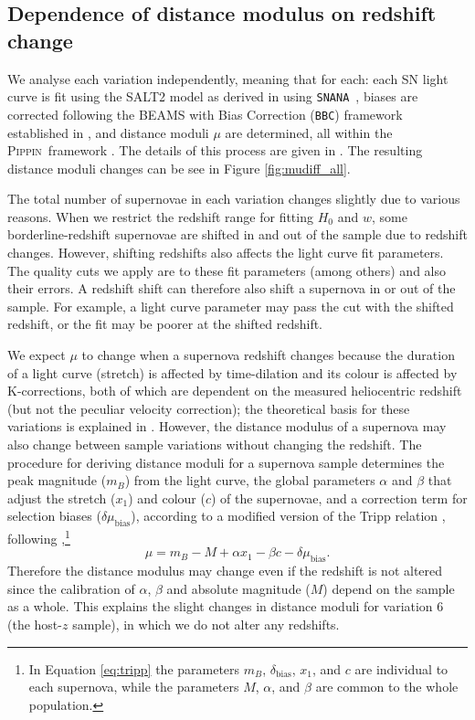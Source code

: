 \documentclass[
  journal=pasa,
  manuscript=research-paper,
  year=2022,
]{cup-journal}
\newcommand{\Pippin}{\textsc{Pippin}}
\newcommand{\SNANA}{\texttt{SNANA}}
\begin{document}
\subsection{Dependence of distance modulus on redshift change}\label{subsec:dmudz}
We analyse each variation independently, meaning that for each:
each SN light curve is fit using the SALT2 model \cite{Guy2010} as derived in \citet{Brout2022cals} using \SNANA\ \citep{Kessler2009}, biases are corrected following the BEAMS with Bias Correction (\texttt{BBC}) framework established in \cite{Kessler2017}, and distance moduli $\mu$ are determined, all within the \Pippin\ framework \citep{Hinton_and_Brout2020}.
The details of this process are given in \citet{Brout2022cosmo}. 
The resulting distance moduli changes can be see in Figure \ref{fig:mudiff_all}.

The total number of supernovae in each variation changes slightly due to various reasons. 
When we restrict the redshift range for fitting $H_0$ and $w$, some borderline-redshift supernovae are shifted in and out of the sample due to redshift changes.
However, shifting redshifts also affects the light curve fit parameters.
The quality cuts we apply are to these fit parameters (among others) and also their errors.
A redshift shift can therefore also shift a supernova in or out of the sample.
For example, a light curve parameter may pass the cut with the shifted redshift, or the fit may be poorer at the shifted redshift.

We expect $\mu$ to change when a supernova redshift changes because the duration of a light curve (stretch) is affected by time-dilation and its colour is affected by K-corrections, both of which are dependent on the measured heliocentric redshift (but not the peculiar velocity correction); the theoretical basis for these variations is explained in \citet{Huterer2004}. 
However, the distance modulus of a supernova may also change between sample variations without changing the redshift.
The procedure for deriving distance moduli for a supernova sample \citep[e.g.~using \texttt{BBC;}][]{Kessler2017} determines the peak magnitude ($m_B$) from the light curve, the global parameters $\alpha$ and $\beta$ that adjust the stretch ($x_1$) and colour ($c$) of the supernovae, and a correction term for selection biases ($\delta\mu_{\text{bias}}$), according to a modified version of the Tripp relation \citep{Tripp1998}, following \citet{Kessler2019},\footnote{In Equation \ref{eq:tripp} the parameters $m_B$, $\delta_{\text{bias}}$, $x_1$, and $c$ are individual to each supernova, while the parameters $M$, $\alpha$, and $\beta$ are common to the whole population.}
\begin{equation} 
\mu = m_B-M+\alpha x_1 - \beta c -\delta\mu_{\text{bias}}.\label{eq:tripp}
\end{equation} 
Therefore the distance modulus may change even if the redshift is not altered since the calibration of $\alpha$, $\beta$ and absolute magnitude ($M$) depend on the sample as a whole.
This explains the slight changes in distance moduli for variation 6 (the host-$z$ sample), in which we do not alter any redshifts. 
\end{document}

